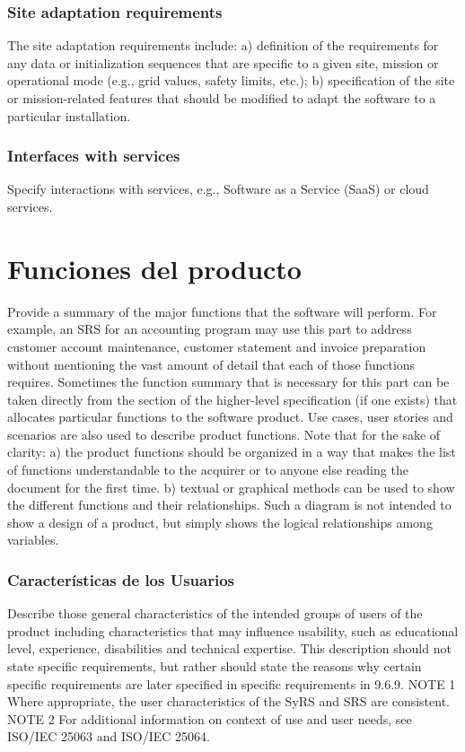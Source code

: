 \documentclass[12pt, a4paper, twoside]{article}
\begin{document}
\subsubsection{Site adaptation requirements}
The site adaptation requirements include:
a) definition of the requirements for any data or initialization sequences that are specific to a given
site, mission or operational mode (e.g., grid values, safety limits, etc.);
b) specification of the site or mission-related features that should be modified to adapt the software
to a particular installation.

\subsubsection{Interfaces with services}
Specify interactions with services, e.g., Software as a Service (SaaS) or cloud services.


\section{Funciones del producto}
Provide a summary of the major functions that the software will perform. For example, an SRS for an
accounting program may use this part to address customer account maintenance, customer statement
and invoice preparation without mentioning the vast amount of detail that each of those functions
requires.
Sometimes the function summary that is necessary for this part can be taken directly from the section
of the higher-level specification (if one exists) that allocates particular functions to the software
product.
Use cases, user stories and scenarios are also used to describe product functions.
Note that for the sake of clarity:
a) the product functions should be organized in a way that makes the list of functions understandable
to the acquirer or to anyone else reading the document for the first time.
b) textual or graphical methods can be used to show the different functions and their relationships.
Such a diagram is not intended to show a design of a product, but simply shows the logical
relationships among variables.

 \subsubsection{Características de los Usuarios}
 Describe those general characteristics of the intended groups of users of the product including
 characteristics that may influence usability, such as educational level, experience, disabilities and
 technical expertise. This description should not state specific requirements, but rather should state the
 reasons why certain specific requirements are later specified in specific requirements in 9.6.9.
 NOTE 1 Where appropriate, the user characteristics of the SyRS and SRS are consistent.
 NOTE 2 For additional information on context of use and user needs, see ISO/IEC 25063 and ISO/IEC 25064.
\end{document}
